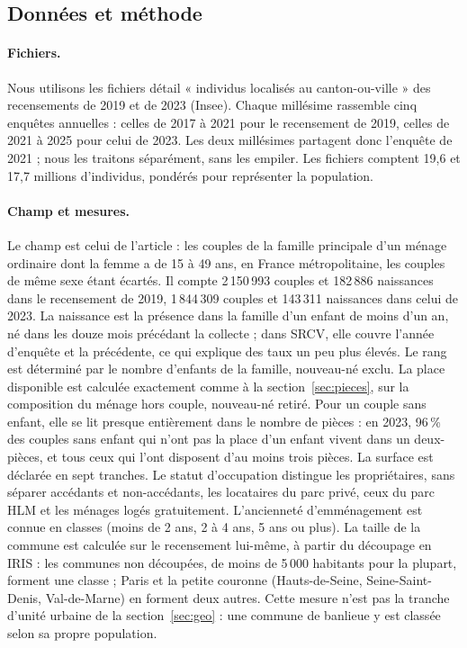 \documentclass[11pt,a4paper]{article}
\theoremstyle{plain}
\theoremstyle{definition}
\theoremstyle{remark}
\begin{document}
\subsection*{Données et méthode}

\paragraph{Fichiers.} Nous utilisons les fichiers détail « individus localisés au canton-ou-ville » des recensements de 2019 et de 2023 (Insee). Chaque millésime rassemble cinq enquêtes annuelles : celles de 2017 à 2021 pour le recensement de 2019, celles de 2021 à 2025 pour celui de 2023. Les deux millésimes partagent donc l'enquête de 2021 ; nous les traitons séparément, sans les empiler. Les fichiers comptent 19,6 et 17,7 millions d'individus, pondérés pour représenter la population.

\paragraph{Champ et mesures.} Le champ est celui de l'article : les couples de la famille principale d'un ménage ordinaire dont la femme a de 15 à 49 ans, en France métropolitaine, les couples de même sexe étant écartés. Il compte 2\,150\,993 couples et 182\,886 naissances dans le recensement de 2019, 1\,844\,309 couples et 143\,311 naissances dans celui de 2023. La naissance est la présence dans la famille d'un enfant de moins d'un an, né dans les douze mois précédant la collecte ; dans SRCV, elle couvre l'année d'enquête et la précédente, ce qui explique des taux un peu plus élevés. Le rang est déterminé par le nombre d'enfants de la famille, nouveau-né exclu. La place disponible est calculée exactement comme à la section~\ref{sec:pieces}, sur la composition du ménage hors couple, nouveau-né retiré. Pour un couple sans enfant, elle se lit presque entièrement dans le nombre de pièces : en 2023, 96\,\% des couples sans enfant qui n'ont pas la place d'un enfant vivent dans un deux-pièces, et tous ceux qui l'ont disposent d'au moins trois pièces. La surface est déclarée en sept tranches. Le statut d'occupation distingue les propriétaires, sans séparer accédants et non-accédants, les locataires du parc privé, ceux du parc HLM et les ménages logés gratuitement. L'ancienneté d'emménagement est connue en classes (moins de 2 ans, 2 à 4 ans, 5 ans ou plus). La taille de la commune est calculée sur le recensement lui-même, à partir du découpage en IRIS : les communes non découpées, de moins de 5\,000 habitants pour la plupart, forment une classe ; Paris et la petite couronne (Hauts-de-Seine, Seine-Saint-Denis, Val-de-Marne) en forment deux autres. Cette mesure n'est pas la tranche d'unité urbaine de la section~\ref{sec:geo} : une commune de banlieue y est classée selon sa propre population.
\end{document}

